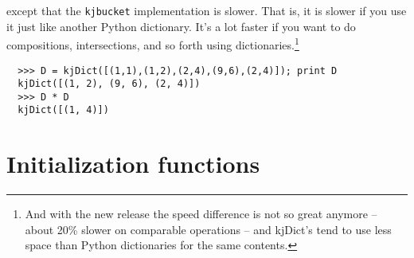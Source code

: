 \begin{description}
except that the {\tt kjbucket} implementation is 
slower.  That is, it is slower if you use it
just like another Python dictionary.  It's a lot faster
if you want to do compositions, intersections, and so forth
using dictionaries.\footnote{And with the new release the speed
difference is not so great anymore -- about 20\% slower on
comparable operations -- and kjDict's tend to use
less space than Python dictionaries for the same contents.}
\begin{verbatim}
  >>> D = kjDict([(1,1),(1,2),(2,4),(9,6),(2,4)]); print D
  kjDict([(1, 2), (9, 6), (2, 4)])
  >>> D * D
  kjDict([(1, 4)])
\end{verbatim}
\end{description}

\section{Initialization functions}

